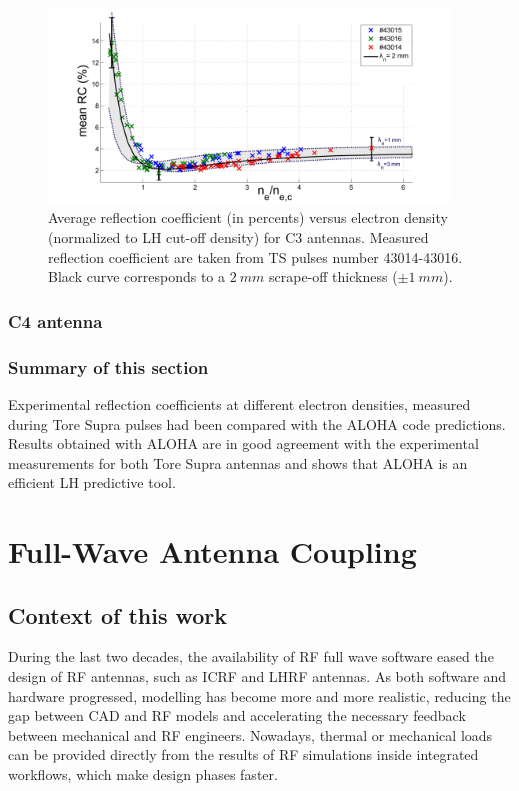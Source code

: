 \begin{figure}[h]
	\centering
	\includegraphics[width=0.95\textwidth]{figures/chap2/Tore_Supra/C3_mean_lowerMod}
	\caption{Average reflection  coefficient (in percents) versus electron density (normalized to LH cut-off density) for C3 antennas. Measured reflection  coefficient are taken from TS pulses number 43014-43016. Black curve corresponds to a $2~mm$ scrape-off thickness ($\pm 1~mm$).}
	\label{fig:MarkII_mean_RC}
\end{figure}




\subsubsection{C4 antenna}

\subsubsection{Summary of this section}

Experimental reflection coefficients at different electron densities, measured during Tore Supra pulses had been compared with the ALOHA code predictions. Results obtained with ALOHA are in good agreement with the experimental measurements for both Tore Supra antennas and shows that ALOHA is an efficient LH predictive tool. 

\section{Full-Wave Antenna Coupling}\label{sec:LHCD_FW_antena_coupling}
\subsection{Context of this work}
During the last two decades, the availability of RF full wave software eased the design of RF antennas, such as ICRF and LHRF antennas. As both software and hardware progressed, modelling has become more and more realistic, reducing the gap between CAD and RF models and accelerating the necessary feedback between mechanical and RF engineers. Nowadays, thermal or mechanical loads can be provided directly from the results of RF simulations inside integrated workflows, which make design phases faster.

